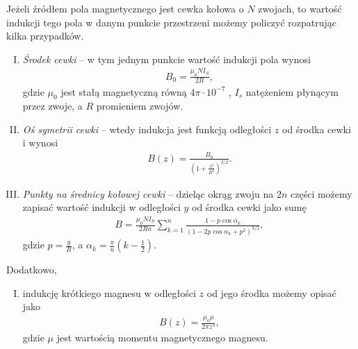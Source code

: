 \documentclass{article}
\begin{document}
Jeżeli źródłem pola magnetycznego jest cewka kołowa o $N$ zwojach, to
wartość indukcji tego pola w danym punkcie przestrzeni możemy
policzyć rozpatrując kilka przypadków.
\begin{enumerate}[I.]
    \item \emph{Środek cewki} -- w tym jednym punkcie wartość indukcji
    pola wynosi
    \begin{align}
        B_0 = \frac{\mu_0NI_S}{2R},
        \label{eq:Bsimple}
    \end{align}
    gdzie $\mu_0$ jest stałą magnetyczną równą $4 \pi \cdot 10^{-7}$ \SI{}{\constmag}, $I_s$ natężeniem płynącym przez zwoje, a $R$
    promieniem zwojów.
    \item \emph{Oś symetrii cewki} -- wtedy indukcja jest funkcją
    odległości $z$ od środka cewki i wynosi
    \begin{align}
    \label{IndukcjaB}
        B(z) = \frac{B_0}{\left(1 + \frac{z^2}{R^2}\right)^{3/2}}.
    \end{align}
    \item \emph{Punkty na średnicy kołowej cewki} -- dzieląc okrąg
    zwoju na $2n$ części możemy zapisać wartość indukcji w odległości
    $y$ od środka cewki jako sumę
    \begin{align}
        B = \frac{\mu_0NI_S}{2Rn}\sum^n_{k=1}\frac{1 - p\cos{\alpha_k}}{(1 - 2p\cos{\alpha_k} + p^2)^{3/2}},
    \end{align}
    gdzie $p = \frac{y}{R}$, a $\alpha_k = \frac{\pi}{n}\left(k - \frac{1}{2}\right)$.
\end{enumerate}
\newpage
Dodatkowo,
\begin{enumerate}[IV.]
    \item indukcję krótkiego magnesu w odległości $z$ od jego środka
    możemy opisać jako
    \begin{align}
        B(z) = \frac{\mu_0\mu}{2\pi z^3},
        \label{eq:Bmag}
    \end{align}
    gdzie $\mu$ jest wartością momentu magnetycznego magnesu.
\end{enumerate}
\end{document}
